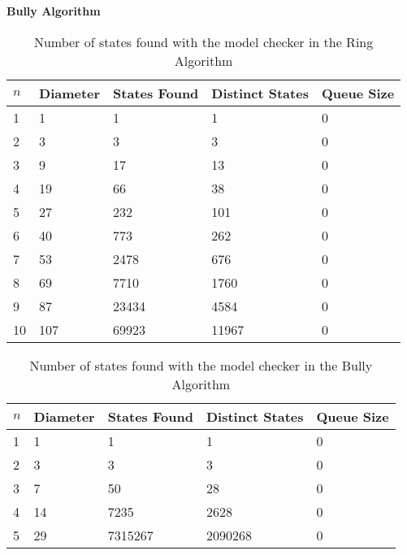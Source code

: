 \documentclass{report}
\begin{document}
\noindent
\textbf{Bully Algorithm}\\
\noindent



\begin{table}[]
  \centering
\begin{tabular}{|l|l|l|l|l|}
\hline
$n$ & Diameter & States Found & Distinct States & Queue Size \\ \hline
1   & 1        & 1            & 1               & 0          \\ \hline
2   & 3        & 3            & 3               & 0          \\ \hline
3   & 9        & 17           & 13              & 0          \\ \hline
4   & 19       & 66           & 38              & 0          \\ \hline
5   & 27       & 232          & 101             & 0          \\ \hline
6   & 40       & 773          & 262             & 0          \\ \hline
7   & 53       & 2478         & 676             & 0          \\ \hline
8   & 69       & 7710         & 1760            & 0          \\ \hline
9   & 87       & 23434        & 4584            & 0          \\ \hline
10  & 107      & 69923        & 11967           & 0          \\ \hline
\end{tabular}
  \caption{Number of states found with the model checker in the Ring Algorithm}
  \label{numstatesmodelcheckerringalgorithm}
\end{table}
\begin{table}[]
\centering
\begin{tabular}{|l|l|l|l|l|}
\hline
$n$ & Diameter & States Found & Distinct States & Queue Size \\ \hline
1   & 1        & 1            & 1               & 0          \\ \hline
2   & 3        & 3            & 3               & 0          \\ \hline
3   & 7        & 50           & 28              & 0          \\ \hline
4   & 14       & 7235         & 2628            & 0          \\ \hline
5   & 29       & 7315267      & 2090268         & 0          \\ \hline
\end{tabular}
  \caption{Number of states found with the model checker in the Bully Algorithm}
  \label{numstatesmodelcheckerbullyalgorithm}
\end{table}
\end{document}
